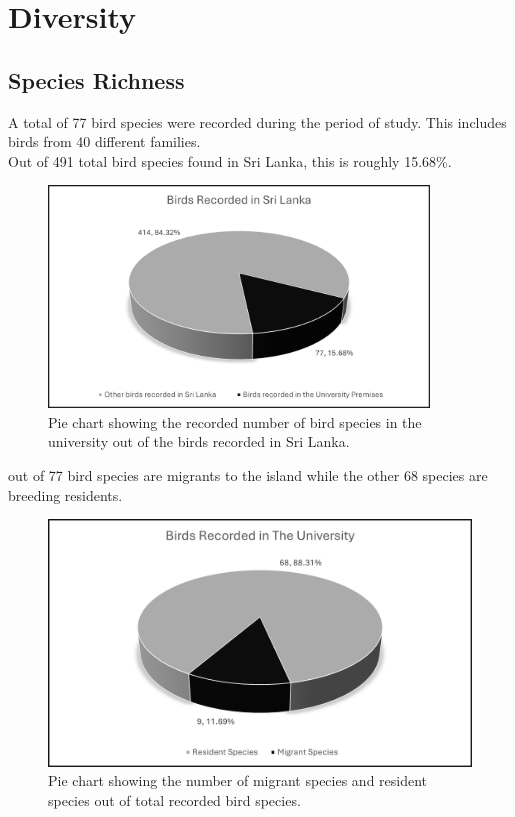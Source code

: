 \chapter{Diversity}
\label{cp:Diversity}

\section{Species Richness}
A total of 77 bird species were recorded during the period of study. This includes birds from 40 different families.\\
Out of 491 total bird species found in Sri Lanka, this is roughly 15.68\%.

\begin{figure}[!htpb]
    \centering
    \includegraphics[width=0.9\textwidth]{Figures/pieChart1.png}
    \caption[]{Pie chart showing the recorded number of bird species in the university out of the birds recorded in Sri Lanka.}
    \label{fig:figure-01}
\end{figure}
 out of 77 bird species are migrants to the island while the other 68 species are breeding residents. 

\begin{figure}[!htpb]
    \centering
    \includegraphics[width=\linewidth]{Figures/pieChart2.png}
    \caption[]{Pie chart showing the number of migrant species and resident species out of total recorded bird species.}
    \label{fig:figure-01}
\end{figure}
